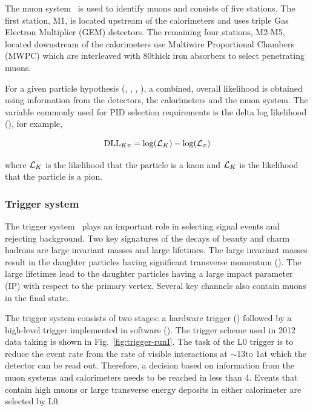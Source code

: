 The muon system~\cite{muon-tdr,muon-tdr2,muon-tdr3,muon-perf} is used to identify muons and consists of five stations. The first station, M1,  is located upstream of the calorimeters and uses triple Gas Electron Multiplier (GEM) detectors. The remaining four stations, M2-M5, located downstream of the calorimeters use Multiwire Proportional Chambers (MWPC) which are interleaved with 80\cm thick iron absorbers to select penetrating muons.

For a given particle hypothesis (\kaon, \pion, \muon, \proton), a combined, overall likelihood is obtained using information from the \rich detectors, the calorimeters and the muon system. The variable commonly used for PID selection requirements is the delta log likelihood (\dll), for example,

\begin{equation}
\mathrm{DLL}_{{K}{\pi}} = \log(\mathcal{L}_{{K}}) - \log(\mathcal{L}_{{\pi}})
\end{equation}

\noindent where $\mathcal{L}_{{K}}$ is the likelihood that the particle is a kaon and $\mathcal{L}_{{K}}$ is the likelihood that the particle is a pion.
\subsubsection{Trigger system}
\label{detector:trigger}

The \lhcb trigger system~\cite{trigger-tdr,trigger-perf} plays an important role in selecting signal events and rejecting background. Two key signatures of the decays of beauty and charm hadrons are large invariant masses and large lifetimes. The large invariant masses result in the daughter particles having significant transverse momentum (\pt). The large lifetimes lead to the daughter particles having a large impact parameter (IP) with respect to the primary vertex. Several key channels also contain muons in the final state.

The trigger system consists of two stages: a hardware trigger (\lone) followed by a high-level trigger implemented in software (\hlt). The trigger scheme used in 2012 data taking is shown in Fig.~\ref{fig:trigger-runI}. The task of the L0 trigger is to reduce the event rate from the rate of visible interactions at $\sim$13\mhz to 1\mhz at which the \lhcb detector can be read out. Therefore, a decision based on information from the muon systems and calorimeters needs to be reached in less than 4\mus. Events that contain high \pt muons or large transverse energy deposits in either calorimeter are selected by L0.

